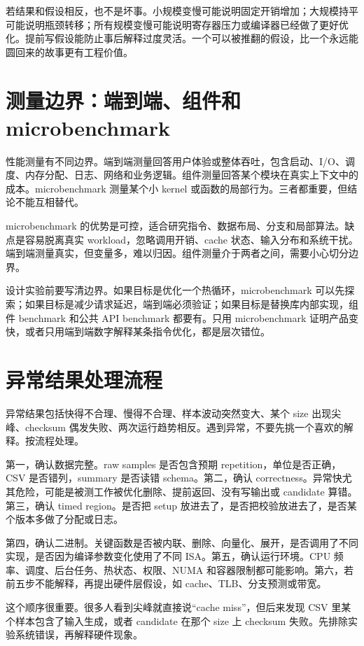 若结果和假设相反，也不是坏事。小规模变慢可能说明固定开销增加；大规模持平可能说明瓶颈转移；所有规模变慢可能说明寄存器压力或编译器已经做了更好优化。提前写假设能防止事后解释过度灵活。一个可以被推翻的假设，比一个永远能圆回来的故事更有工程价值。

\section{测量边界：端到端、组件和 microbenchmark}

性能测量有不同边界。端到端测量回答用户体验或整体吞吐，包含启动、I/O、调度、内存分配、日志、网络和业务逻辑。组件测量回答某个模块在真实上下文中的成本。microbenchmark 测量某个小 kernel 或函数的局部行为。三者都重要，但结论不能互相替代。

microbenchmark 的优势是可控，适合研究指令、数据布局、分支和局部算法。缺点是容易脱离真实 workload，忽略调用开销、cache 状态、输入分布和系统干扰。端到端测量真实，但变量多，难以归因。组件测量介于两者之间，需要小心切分边界。

设计实验前要写清边界。如果目标是优化一个热循环，microbenchmark 可以先探索；如果目标是减少请求延迟，端到端必须验证；如果目标是替换库内部实现，组件 benchmark 和公共 API benchmark 都要有。只用 microbenchmark 证明产品变快，或者只用端到端数字解释某条指令优化，都是层次错位。

\section{异常结果处理流程}

异常结果包括快得不合理、慢得不合理、样本波动突然变大、某个 size 出现尖峰、checksum 偶发失败、两次运行趋势相反。遇到异常，不要先挑一个喜欢的解释。按流程处理。

第一，确认数据完整。raw samples 是否包含预期 repetition，单位是否正确，CSV 是否错列，summary 是否读错 schema。第二，确认 correctness。异常快尤其危险，可能是被测工作被优化删除、提前返回、没有写输出或 candidate 算错。第三，确认 timed region。是否把 setup 放进去了，是否把校验放进去了，是否某个版本多做了分配或日志。

第四，确认二进制。关键函数是否被内联、删除、向量化、展开，是否调用了不同实现，是否因为编译参数变化使用了不同 ISA。第五，确认运行环境。CPU 频率、调度、后台任务、热状态、权限、NUMA 和容器限制都可能影响。第六，若前五步不能解释，再提出硬件层假设，如 cache、TLB、分支预测或带宽。

这个顺序很重要。很多人看到尖峰就直接说“cache miss”，但后来发现 CSV 里某个样本包含了输入生成，或者 candidate 在那个 size 上 checksum 失败。先排除实验系统错误，再解释硬件现象。

